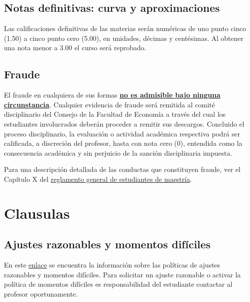 \documentclass[12pt]{article}
\begin{document}
\subsection*{Notas definitivas: curva y aproximaciones} 

Las calificaciones definitivas de las materias serán numéricas de uno punto cinco (1.50) a cinco punto cero (5.00), en unidades, décimas y centésimas. Al obtener una nota menor a 3.00 el curso será reprobado.

\subsection*{Fraude}

El fraude en cualquiera de sus formas \textbf{\underline{no es admisible bajo ninguna circunstancia}}. Cualquier evidencia de fraude será remitida al comité disciplinario del Consejo de la Facultad de Economía a través del cual los estudiantes involucrados deberán proceder a remitir sus descargos. Concluido el proceso disciplinario, la evaluación o actividad académica respectiva podrá ser calificada, a discreción del profesor, hasta con nota cero (0), entendida como la consecuencia académica y sin perjuicio de la sanción disciplinaria impuesta.

Para una descripción detallada de las conductas que constituyen fraude, ver el Capítulo X del \href{https://secretariageneral.uniandes.edu.co/images/documents/reglamento-maestria-web-2023.pdf}{\underline{reglamento general de estudiantes de maestría}}.


\section{Clausulas} 

\subsection*{Ajustes razonables y momentos difíciles} 

En este \href{https://decanaturadeestudiantes.uniandes.edu.co/ajustes-razonables-y-politica-momentos-dificiles}{enlace} se encuentra la información sobre las políticas de ajustes razonables y momentos difíciles. Para solicitar un ajuste razonable o activar la política de momentos difíciles es responsabilidad del estudiante contactar al profesor oportunamente.
\end{document}
